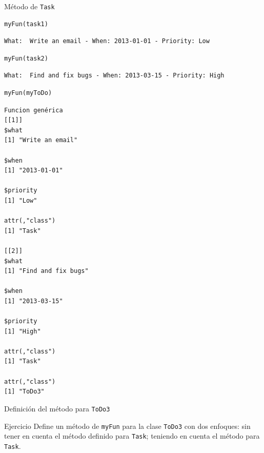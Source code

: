 \documentclass[xcolor={usenames,svgnames,dvipsnames}]{beamer}
\begin{document}
\begin{frame}[label={sec:orga28e234},fragile]{Método de \texttt{Task}}
 \lstset{language=r,label= ,caption= ,captionpos=b,numbers=none}
\begin{lstlisting}
myFun(task1)
\end{lstlisting}

\begin{verbatim}
What:  Write an email - When: 2013-01-01 - Priority: Low
\end{verbatim}


\lstset{language=r,label= ,caption= ,captionpos=b,numbers=none}
\begin{lstlisting}
myFun(task2)
\end{lstlisting}

\begin{verbatim}
What:  Find and fix bugs - When: 2013-03-15 - Priority: High
\end{verbatim}


\lstset{language=r,label= ,caption= ,captionpos=b,numbers=none}
\begin{lstlisting}
myFun(myToDo)
\end{lstlisting}

\begin{verbatim}
Funcion genérica
[[1]]
$what
[1] "Write an email"

$when
[1] "2013-01-01"

$priority
[1] "Low"

attr(,"class")
[1] "Task"

[[2]]
$what
[1] "Find and fix bugs"

$when
[1] "2013-03-15"

$priority
[1] "High"

attr(,"class")
[1] "Task"

attr(,"class")
[1] "ToDo3"
\end{verbatim}
\end{frame}

\begin{frame}[label={sec:org19c4daf},fragile]{Definición del método para \texttt{ToDo3}}
 \begin{block}{Ejercicio}
Define un método de \texttt{myFun} para la clase \texttt{ToDo3} con dos enfoques: sin tener en cuenta el método definido para \texttt{Task}; teniendo en cuenta el método para \texttt{Task}.
\end{block}
\end{frame}
\end{document}
